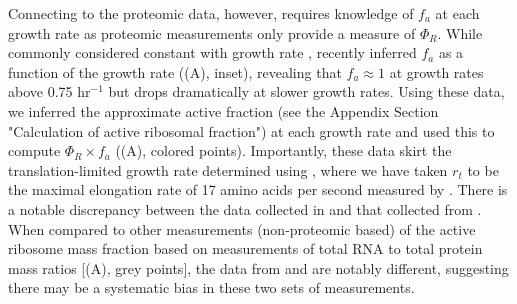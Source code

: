 Connecting  to the proteomic data, however, requires knowledge
of $f_a$ at each growth rate as proteomic measurements only provide a measure of
$\Phi_R$. While commonly considered constant with growth rate \citep{klumpp2013,
bosdriesz2015, kostinski2020}, \cite{dai2016} recently inferred $f_a$ as a
function of the growth rate ((A), inset),
revealing that $f_a \approx 1$ at growth rates above 0.75 hr$^{-1}$ but drops
dramatically at slower growth rates. Using these data, we inferred the
approximate active fraction (see the Appendix Section "Calculation of active
ribosomal fraction") at each growth rate and used this to compute $\Phi_R \times
f_a$ ((A), colored points). Importantly,
these data skirt the translation-limited growth rate determined using
, where we have taken $r_t$ to be the maximal elongation rate of
17 amino acids per second measured by \cite{dai2016}. There is a notable
discrepancy between the data collected in \cite{schmidt2016, li2014} and that
collected from \cite{valgepea2013, peebo2015}. When compared to other
measurements (non-proteomic based) of the active ribosome mass fraction based on
measurements of total RNA to total protein mass ratios [(A),
grey points], the data from
\cite{valgepea2013} and \cite{peebo2015} are notably different, suggesting there
may be a systematic bias in these two sets of measurements.


